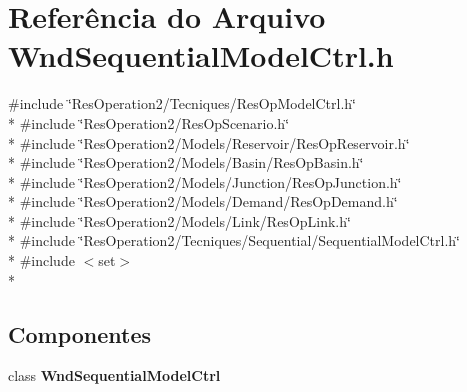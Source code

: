 \section{Referência do Arquivo Wnd\+Sequential\+Model\+Ctrl.\+h}
\label{_wnd_sequential_model_ctrl_8h}
{\ttfamily \#include \char`\"{}Res\+Operation2/\+Tecniques/\+Res\+Op\+Model\+Ctrl.\+h\char`\"{}}\\*
{\ttfamily \#include \char`\"{}Res\+Operation2/\+Res\+Op\+Scenario.\+h\char`\"{}}\\*
{\ttfamily \#include \char`\"{}Res\+Operation2/\+Models/\+Reservoir/\+Res\+Op\+Reservoir.\+h\char`\"{}}\\*
{\ttfamily \#include \char`\"{}Res\+Operation2/\+Models/\+Basin/\+Res\+Op\+Basin.\+h\char`\"{}}\\*
{\ttfamily \#include \char`\"{}Res\+Operation2/\+Models/\+Junction/\+Res\+Op\+Junction.\+h\char`\"{}}\\*
{\ttfamily \#include \char`\"{}Res\+Operation2/\+Models/\+Demand/\+Res\+Op\+Demand.\+h\char`\"{}}\\*
{\ttfamily \#include \char`\"{}Res\+Operation2/\+Models/\+Link/\+Res\+Op\+Link.\+h\char`\"{}}\\*
{\ttfamily \#include \char`\"{}Res\+Operation2/\+Tecniques/\+Sequential/\+Sequential\+Model\+Ctrl.\+h\char`\"{}}\\*
{\ttfamily \#include $<$set$>$}\\*
\subsection*{Componentes}
\begin{DoxyCompactItemize}
\item 
class {\bf Wnd\+Sequential\+Model\+Ctrl}
\end{DoxyCompactItemize}
